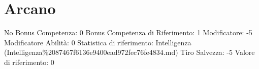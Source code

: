 \section{Arcano}\label{arcano}

\begin{description}
\tightlist
\item[Tags: ABI]
No Bonus Competenza: 0 Bonus Competenza di Riferimento: 1 Modificatore:
-5 Modificatore Abilità: 0 Statistica di riferimento: Intelligenza
(Intelligenza\%2087467f6136e9400ead972fec76fe4834.md) Tiro Salvezza: -5
Valore di riferimento: 0
\end{description}
